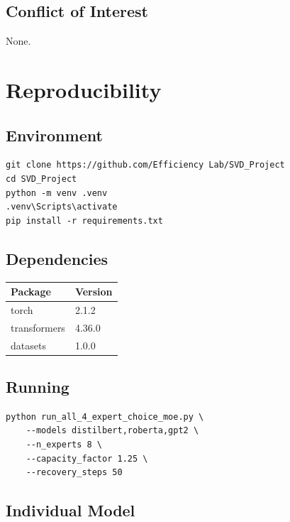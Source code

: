 \subsection{Conflict of Interest}

None.



\section{Reproducibility}

\subsection{Environment}

\begin{lstlisting}
git clone https://github.com/Efficiency Lab/SVD_Project
cd SVD_Project
python -m venv .venv
.venv\Scripts\activate
pip install -r requirements.txt
\end{lstlisting}

\subsection{Dependencies}

\begin{table}[H]
\centering
\small
\begin{tabular}{ll}
\toprule
\textbf{Package} & \textbf{Version} \\
\midrule
torch & 2.1.2 \\
transformers & 4.36.0 \\
datasets & 1.0.0 \\
\bottomrule
\end{tabular}
\end{table}

\subsection{Running}

\begin{lstlisting}
python run_all_4_expert_choice_moe.py \
    --models distilbert,roberta,gpt2 \
    --n_experts 8 \
    --capacity_factor 1.25 \
    --recovery_steps 50
\end{lstlisting}

\subsection{Individual Model}

